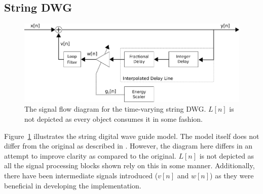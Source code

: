 \documentclass[../main.tex]{subfiles}
\begin{document}
\subsection{String DWG}

\begin{figure}[h]
    \centering
    \includegraphics[scale=.5]{./images/diagrams/stringDWG.png}
    \caption{The signal flow diagram for the time-varying string DWG. $L[n]$ is not depicted as every object consumes it in some fashion.}
    \label{fig:stringDWG}
\end{figure}

Figure~\ref{fig:stringDWG} illustrates the string digital wave guide model. The model itself does not differ from the original as described in . However, the diagram here differs in an attempt to improve clarity as compared to the original. $L[n]$ is not depicted as all the signal processing blocks shown rely on this in some manner. Additionally, there have been intermediate signals introduced ($v[n]$ and $w[n]$) as they were beneficial in developing the implementation.
\end{document}
